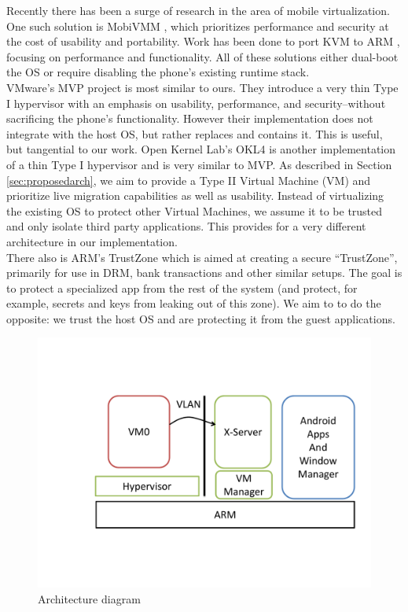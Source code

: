 Recently there has been a surge of research in the area of mobile virtualization.  One such solution is MobiVMM \cite{mobivmm}, which prioritizes performance and security at the cost of usability and portability.  Work has been done to port KVM to ARM \cite{columbia}, focusing on performance and functionality.  All of these solutions either dual-boot the OS or require disabling the phone's existing runtime stack. \\

VMware's MVP project \cite{mvp} is most similar to ours.  They introduce a very thin Type I hypervisor with an emphasis on usability, performance, and security--without sacrificing the phone's functionality.   However their implementation does not integrate with the host OS, but rather replaces and contains it.  This is useful, but tangential to our work.  Open Kernel Lab's OKL4 \cite{okl4} is another implementation of a thin Type I hypervisor and is very similar to MVP.  As described in Section \ref{sec:proposedarch}, we aim to provide a Type II Virtual Machine (VM) and prioritize live migration capabilities as well as usability. Instead of virtualizing the existing OS to protect other Virtual Machines, we assume it to be trusted and only isolate third party applications.  This provides for a very different architecture in our implementation. \\

There also is ARM's TrustZone \cite{trustzone} which is aimed at creating a secure ``TrustZone'', primarily for use in DRM, bank transactions and other similar setups.  The goal is to protect a specialized app from the rest of the system (and protect, for example, secrets and keys from leaking out of this zone).  We aim to to do the opposite: we trust the host OS and are protecting it from the guest applications.

\begin{figure}[tbh]
\centering
\includegraphics[width=1.0\columnwidth]{arch}
\caption{Architecture diagram}
\label{fig:arch}
\end{figure}

